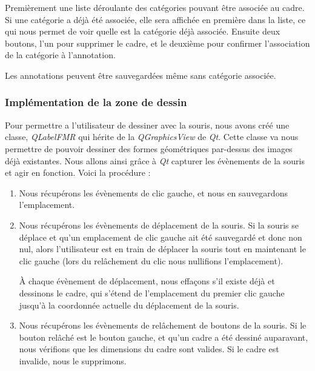 \documentclass{rapport}
\begin{document}
            Premièrement une liste déroulante des catégories pouvant être associée au cadre. Si une catégorie a déjà été associée, elle sera affichée en première dans la liste, ce qui nous permet de voir quelle est la catégorie déjà associée. Ensuite deux boutons, l'un pour supprimer le cadre, et le deuxième pour confirmer l'association de la catégorie à l'annotation.

            Les annotations peuvent être sauvegardées même sans catégorie associée.

            \subsubsection{Implémentation de la zone de dessin}
            Pour permettre a l'utilisateur de dessiner avec la souris, nous avons créé une classe, \textit{QLabelFMR} qui hérite de la \textit{QGraphicsView} de \textit{Qt}.
            Cette classe va nous permettre de pouvoir dessiner des formes géométriques par-dessus des images déjà existantes. 
            Nous allons ainsi grâce à \textit{Qt} capturer les évènements de la souris et agir en fonction. Voici la procédure :

            \begin{enumerate}
                \item Nous récupérons les évènements de clic gauche, et nous en sauvegardons l'emplacement.

                \item Nous récupérons les évènements de déplacement de la souris. Si la souris se déplace et qu'un emplacement de clic gauche ait été sauvegardé et donc non nul, alors l'utilisateur est en train de déplacer la souris tout en maintenant le clic gauche (lors du relâchement du clic nous nullifions l'emplacement).

                À chaque évènement de déplacement, nous effaçons s'il existe déjà et dessinons le cadre, qui s'étend de l'emplacement du premier clic gauche jusqu'à la coordonnée actuelle du déplacement de la souris.

                \item Nous récupérons les évènements de relâchement de boutons de la souris. Si le bouton relâché est le bouton gauche, et qu'un cadre a été dessiné auparavant, nous vérifions que les dimensions du cadre sont valides. Si le cadre est invalide, nous le supprimons.

            \end{enumerate}
\end{document}
